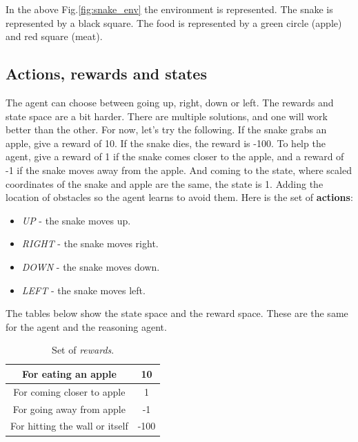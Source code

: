 \documentclass[11pt]{article}
\begin{document}
In the above Fig.\ref{fig:snake_env} the environment is represented. The snake is represented by a black square. The food is represented by a green circle (apple) and red square (meat).
\subsection{Actions, rewards and states}
The agent can choose between going up, right, down or left. The rewards and state space are a bit harder. There are multiple solutions, and one will work better than the other. For now, let’s try the following. If the snake grabs an apple, give a reward of 10. If the snake dies, the reward is -100. To help the agent, give a reward of 1 if the snake comes closer to the apple, 
and a reward of -1 if the snake moves away from the apple. And coming to the state, where scaled coordinates of the snake and apple are the same, the state is 1. Adding the location of obstacles so the agent learns to avoid them.
Here is the set of \textbf{actions}:
\begin{itemize}
    \item \textit{UP} - the snake moves up.
    \item \textit{RIGHT} - the snake moves right.
    \item \textit{DOWN} - the snake moves down.
    \item \textit{LEFT} - the snake moves left.
\end{itemize}
The tables below show the state space and the reward space. These are the same for the agent and the reasoning agent.

\begin{table}[ht]
\begin{center}
\begin{tabular}{ |c | c| }
\hline
 For eating an apple  & 10 \\ 
\hline
 For coming closer to apple  & 1 \\  
\hline
 For going away from apple & -1  \\ 
\hline
 For hitting the wall or itself & -100  \\ 
\hline
\end{tabular}
\end{center}
\label{tab:rewards-table}
\caption{Set of \textit{rewards}.}
\end{table}
\end{document}
